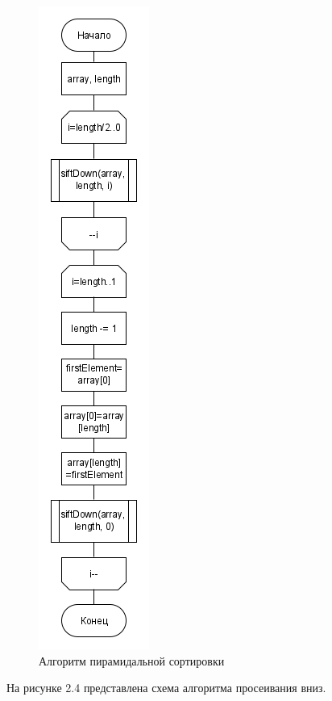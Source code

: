 \begin{figure}[H]
	\centering
	\includegraphics[height=0.8\textheight]{src/heapSort}
	\caption{Алгоритм пирамидальной сортировки}
	\label{fig:heapsort}
\end{figure}
На рисунке 2.4 представлена схема алгоритма просеивания вниз.
